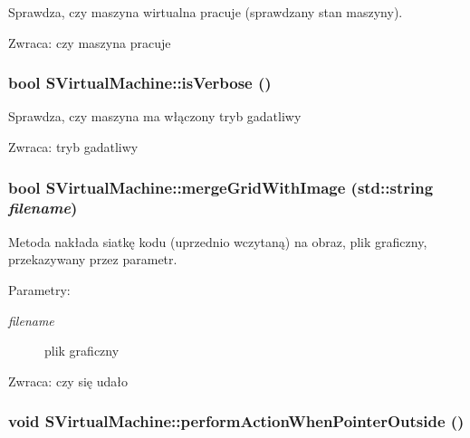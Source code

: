 Sprawdza, czy maszyna wirtualna pracuje (sprawdzany stan maszyny). \begin{Desc}
\item[Zwraca:]czy maszyna pracuje \end{Desc}
\hypertarget{classSVirtualMachine_38d1e09d68d418ce34ae46d6a9dbb6dd}{
\subsubsection[{isVerbose}]{\setlength{\rightskip}{0pt plus 5cm}bool SVirtualMachine::isVerbose ()}}
\label{classSVirtualMachine_38d1e09d68d418ce34ae46d6a9dbb6dd}


Sprawdza, czy maszyna ma włączony tryb gadatliwy \begin{Desc}
\item[Zwraca:]tryb gadatliwy \end{Desc}
\hypertarget{classSVirtualMachine_0257c841ecfbb17f2c85ffd2d8764de8}{
\subsubsection[{mergeGridWithImage}]{\setlength{\rightskip}{0pt plus 5cm}bool SVirtualMachine::mergeGridWithImage (std::string {\em filename})}}
\label{classSVirtualMachine_0257c841ecfbb17f2c85ffd2d8764de8}


Metoda nakłada siatkę kodu (uprzednio wczytaną) na obraz, plik graficzny, przekazywany przez parametr. \begin{Desc}
\item[Parametry:]
\begin{description}
\item[{\em filename}]plik graficzny \end{description}
\end{Desc}
\begin{Desc}
\item[Zwraca:]czy się udało \end{Desc}
\hypertarget{classSVirtualMachine_4d895936a3676ec3226383b3242be1af}{
\subsubsection[{performActionWhenPointerOutside}]{\setlength{\rightskip}{0pt plus 5cm}void SVirtualMachine::performActionWhenPointerOutside ()}}
\label{classSVirtualMachine_4d895936a3676ec3226383b3242be1af}


